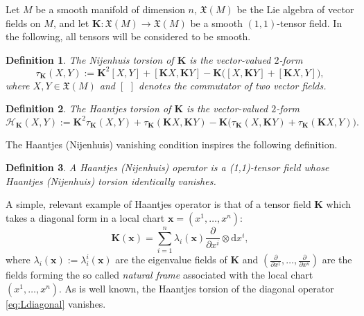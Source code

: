 \documentclass[10pt]{amsart}
\numberwithin{equation}{section}
\newcommand\noi{\noindent}
\newcommand{\rd}{\mathrm{d}}
\newtheorem{definition}{Definition}
\theoremstyle{definition}
\begin{document}
	Let $M$ be a smooth manifold of dimension $n$, $\mathfrak{X}(M)$ be the Lie algebra of vector fields on $M$, and let $\boldsymbol{K}:\mathfrak{X}(M)\rightarrow \mathfrak{X}(M)$ be a smooth $(1,1)$-tensor field. In the following, all tensors will be considered to be smooth.
	\begin{definition} \label{def:N}
		The
		\textit{Nijenhuis torsion} of $\boldsymbol{K}$ is the vector-valued $2$-form
		\begin{equation} \label{eq:Ntorsion}
			\tau_ {\boldsymbol{K}} (X,Y):=\boldsymbol{K}^2[X,Y] +[\boldsymbol{K}X,\boldsymbol{K}Y]-\boldsymbol{K}\Big([X,\boldsymbol{K}Y]+[\boldsymbol{K}X,Y]\Big),
		\end{equation}
		where $X,Y \in \mathfrak{X}(M)$ and $[ \, \ ]$ denotes the commutator of two vector fields.
	\end{definition}
	\begin{definition} \label{def:H}
		\noi The \textit{Haantjes torsion} of $\boldsymbol{K}$ is the vector-valued $2$-form
		\begin{equation} \label{eq:Haan}
			\mathcal{H}_{\boldsymbol{K}}(X,Y):=\boldsymbol{K}^2 \tau_{\boldsymbol{K}}(X,Y)+\tau_{\boldsymbol{K}}(\boldsymbol{K}X,\boldsymbol{K}Y)-\boldsymbol{K}\Big(\tau_{\boldsymbol{K}}(X,\boldsymbol{K}Y)+\tau_{\boldsymbol{K}}(\boldsymbol{K}X,Y)\Big).
		\end{equation}
	\end{definition}
	
	The Haantjes (Nijenhuis) vanishing condition inspires the following definition.
	\begin{definition}
		A Haantjes (Nijenhuis) operator is a (1,1)-tensor field whose Haantjes (Nijenhuis) torsion identically vanishes.
	\end{definition}
	
	
	A simple, relevant example of Haantjes operator is that of a tensor field $\boldsymbol{K}$ which takes a diagonal form in a local chart $\boldsymbol{x}=(x^1,\ldots,x^n)$:
	\begin{equation}
		\boldsymbol{K}(\boldsymbol{x})=\sum _{i=1}^n \lambda_{i }(\boldsymbol{x}) \frac{\partial}{\partial x^i}\otimes \rd x^i, \label{eq:Ldiagonal}
	\end{equation}
	where $\lambda_{i }(\boldsymbol{x}):=\lambda^{i}_{i}(\boldsymbol{x})$ are the eigenvalue fields of $\boldsymbol{K}$ and $\left(\frac{\partial}{\partial x^1},\ldots, \frac{\partial}{\partial x^n}\right) $ are the fields forming the so called \textit{natural frame} associated with the local chart $(x^{1},\ldots,x^{n})$. As is well known, the Haantjes torsion of the diagonal operator \eqref{eq:Ldiagonal} vanishes. 
	
\end{document}
